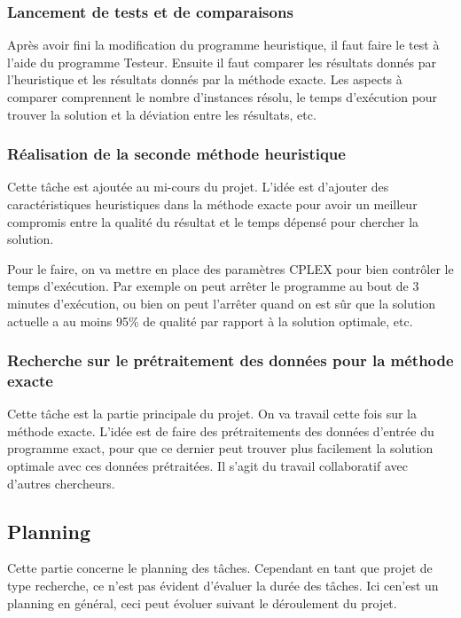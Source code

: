 \subsubsection{Lancement de tests et de comparaisons}
Après avoir fini la modification du programme heuristique, il faut faire le test à l'aide du programme Testeur. Ensuite il faut comparer les résultats donnés par l'heuristique et les résultats donnés par la méthode exacte. Les aspects à comparer comprennent le nombre d'instances résolu, le temps d'exécution pour trouver la solution et la déviation entre les résultats, etc.

\subsubsection{Réalisation de la seconde méthode heuristique}
Cette tâche est ajoutée au mi-cours du projet. L'idée est d'ajouter des caractéristiques heuristiques dans la méthode exacte pour avoir un meilleur compromis entre la qualité du résultat et le temps dépensé pour chercher la solution.


Pour le faire, on va mettre en place des paramètres CPLEX pour bien contrôler le temps d'exécution. Par exemple on peut arrêter le programme au bout de 3 minutes d'exécution, ou bien on peut l'arrêter quand on est sûr que la solution actuelle a au moins 95\% de qualité par rapport à la solution optimale, etc. 

\subsubsection{Recherche sur le prétraitement des données pour la méthode exacte}
Cette tâche est la partie principale du projet. On va travail cette fois sur la méthode exacte. L'idée est de faire des prétraitements des données d'entrée du programme exact, pour que ce dernier peut trouver plus facilement la solution optimale avec ces données prétraitées. Il s'agit du travail collaboratif avec d'autres chercheurs. 

\subsection{Planning}
Cette partie concerne le planning des tâches. Cependant en tant que projet de type recherche, ce n'est pas évident d'évaluer la durée des tâches. Ici cen'est un planning en général, ceci peut évoluer suivant le déroulement du projet.

